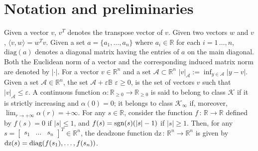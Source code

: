 \documentclass[twocolumn]{autart}
\newcommand{\realn}{\real^n}
\newcommand\diag{{\rm diag}}
\newcommand\sgn{{\rm sgn}}
\newcommand\real{\ensuremath{{\mathbb R}}}
\newcommand{\smallmat}[1]{\left[ \begin{smallmatrix}#1
    \end{smallmatrix} \right]}
\newcommand\dz{\mathrm{dz}}
\begin{document}
\section{Notation and preliminaries}
\label{sec:preliminaries}
Given a vector $v$, $v^T$ denotes the transpose vector 
of $v$. Given two vectors $w$ and $v$, $\langle v,w \rangle = w^Tv$. 
Given a set $a=\{a_1,\dots,a_n\}$ where $a_i\in \real$ for each
$i=1\,\dots,n$, $\mathrm{diag}(a)$ denotes 
a diagonal matrix having the entries of $a$ 
on the main diagonal. Both the Euclidean norm of a vector 
and the corresponding induced matrix norm
are denoted by $|\cdot|$. 
For a vector $v\in \real^n$ and a set $\mathcal{A}\subset \realn$ 
$|v|_{\mathcal{A}}:=\inf_{y\in \mathcal{A}}|y-v|$.
{ 
Given a set $\mathcal{A}\in\realn$, the set $\mathcal{A}+\varepsilon\mathbb{B}$
$\varepsilon\geq 0$, 
is the set of vectors
$v$ such that $|v|_{\mathcal{A}} \leq \varepsilon$. }
A {continuous} function
$\alpha:\real_{\geq 0}\rightarrow\real_{\geq 0}$ is said 
to belong to class $\mathcal{K}$ if it is strictly increasing and $\alpha(0) = 0$;
it belongs to class $\mathcal{K}_{\infty}$ if, moreover, $\lim_{r \rightarrow+\infty}\alpha(r)=+\infty$.
For any $s\in\real$, consider the function 
$f\,:\, \real \to \real$ defined by 
$f(s) = 0$ if $|s|\leq 1$, and 
$f(s) = \sgn(s)(|s|-1)$ if $|s|\geq 1$. Then,
for any $s=\smallmat{s_1 & \dots & s_n}^T\in\realn$,
the deadzone function $\dz\,:\,\realn \to \realn$ is 
given by $\dz(s)=\diag( f(s_1),\dots, f(s_n))$.
\end{document}
